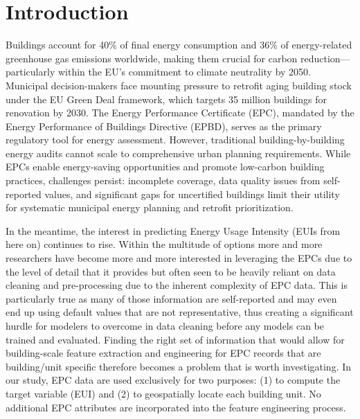 \documentclass[preprint,12pt]{elsarticle}
\begin{document}
\section{Introduction}%
    Buildings account for 40\% of final energy consumption and 36\% of energy-related greenhouse 
  gas emissions worldwide, making them crucial for carbon reduction—particularly within the 
  EU's commitment to climate neutrality by 2050. Municipal decision-makers face mounting 
  pressure to retrofit aging building stock under the EU Green Deal framework, which targets 35
   million buildings for renovation by 2030. The Energy Performance Certificate (EPC), mandated
   by the Energy Performance of Buildings Directive (EPBD), serves as the primary regulatory 
  tool for energy assessment. However, traditional building-by-building energy audits cannot 
  scale to comprehensive urban planning requirements. While EPCs enable energy-saving 
  opportunities and promote low-carbon building practices, challenges persist: incomplete 
  coverage, data quality issues from self-reported values, and significant gaps for uncertified
   buildings limit their utility for systematic municipal energy planning and retrofit 
  prioritization.

        
    In the meantime, the interest in predicting Energy Usage Intensity (EUIs from here on) continues to rise. Within the multitude of options more and more researchers have become more and more interested in leveraging the EPCs due to the level of detail that it provides \cite{sylten_wikell_predicting_2024} but often seen to be heavily reliant on data cleaning and pre-processing due to the inherent complexity of EPC data. This is particularly true as many of those information are self-reported and may even end up using default values that are not representative, thus creating a significant hurdle for modelers to overcome in data cleaning before any models can be trained and evaluated. Finding the right set of information that would allow for building-scale feature extraction and engineering for EPC records that are building/unit specific therefore becomes a problem that is worth investigating. In our study, EPC data are used exclusively for two purposes: (1) to compute the target variable (EUI) and (2) to geospatially locate each building unit. No additional EPC attributes are incorporated into the feature engineering process.
        
\end{document}
